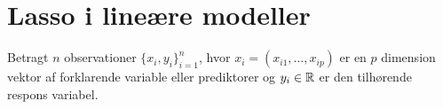 \chapter{Lasso i lineære modeller}

Betragt \(n\) observationer \(\{x_i, y_i\}_{i=1}^n \), hvor $x_i=(x_{i1}, \ldots, x_{ip})$ er en $p$ dimension vektor af forklarende variable eller prediktorer og $y_i \in \mathbb{R}$ er den tilhørende respons variabel.




